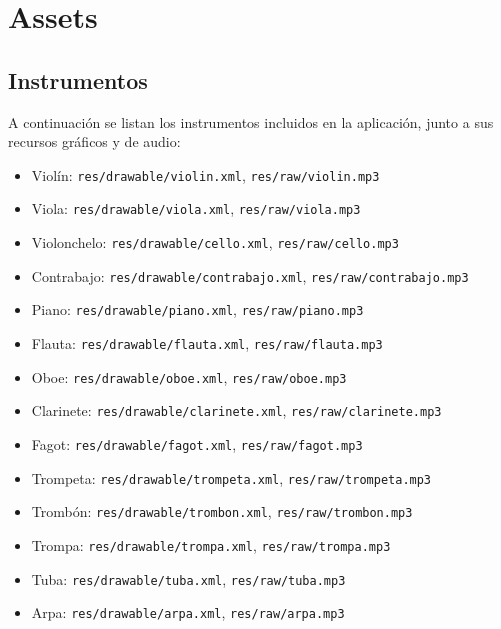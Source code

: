 \documentclass{article}
\newcommand{\iconpath}{/home/khz/git/tabler-icons/icons/outline-white/}
\newcommand{\icon}[1]{}
\newcommand{\instrumentopath}{/home/khz/Documentos/Carrera/MusiKe/instrumentos/svg/}
\newcommand{\instrumento}[1]{\raisebox{-0.6em}{}}
\begin{document}
\newpage

\section{Assets}

\subsection{Instrumentos \icon{music}}

A continuación se listan los instrumentos incluidos en la aplicación, junto a sus recursos gráficos y de audio:

\begin{itemize}
  \item \instrumento{viola} Violín: \texttt{res/drawable/violin.xml}, \texttt{res/raw/violin.mp3}
  \item \instrumento{viola} Viola: \texttt{res/drawable/viola.xml}, \texttt{res/raw/viola.mp3}
  \item \instrumento{cello} Violonchelo: \texttt{res/drawable/cello.xml}, \texttt{res/raw/cello.mp3}
  \item \instrumento{contrabajo} Contrabajo: \texttt{res/drawable/contrabajo.xml}, \texttt{res/raw/contrabajo.mp3}
  \item \instrumento{piano} Piano: \texttt{res/drawable/piano.xml}, \texttt{res/raw/piano.mp3}
  \item \instrumento{flauta} Flauta: \texttt{res/drawable/flauta.xml}, \texttt{res/raw/flauta.mp3}
  \item \instrumento{oboe} Oboe: \texttt{res/drawable/oboe.xml}, \texttt{res/raw/oboe.mp3}
  \item \instrumento{clarinete} Clarinete: \texttt{res/drawable/clarinete.xml}, \texttt{res/raw/clarinete.mp3}
  \item \instrumento{fagot} Fagot: \texttt{res/drawable/fagot.xml}, \texttt{res/raw/fagot.mp3}
  \item \instrumento{trompeta} Trompeta: \texttt{res/drawable/trompeta.xml}, \texttt{res/raw/trompeta.mp3}
  \item \instrumento{trombon} Trombón: \texttt{res/drawable/trombon.xml}, \texttt{res/raw/trombon.mp3}
  \item \instrumento{trompa} Trompa: \texttt{res/drawable/trompa.xml}, \texttt{res/raw/trompa.mp3}
  \item \instrumento{tuba} Tuba: \texttt{res/drawable/tuba.xml}, \texttt{res/raw/tuba.mp3}
  \item \instrumento{arpa} Arpa: \texttt{res/drawable/arpa.xml}, \texttt{res/raw/arpa.mp3}

\end{itemize}
\end{document}
